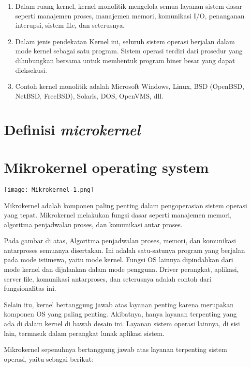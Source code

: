 \begin{enumerate}
	\item Dalam ruang kernel, kernel monolitik mengelola semua layanan sistem dasar seperti manajemen proses, manajemen memori, komunikasi I/O, penanganan interupsi, sistem file, dan seterusnya.
	
	\item Dalam jenis pendekatan Kernel ini, seluruh sistem operasi berjalan dalam mode kernel sebagai satu program. Sistem operasi terdiri dari prosedur yang dihubungkan bersama untuk membentuk program biner besar yang dapat dieksekusi.
	
	\item Contoh kernel monolitik adalah Microsoft Windows, Linux, BSD (OpenBSD, NetBSD, FreeBSD), Solaris, DOS, OpenVMS, dll.
\end{enumerate}

\vskip0.5cm


\section{Definisi \textit{microkernel}}

\section*{Mikrokernel operating system}
\texttt{[image: Mikrokernel-1.png]}


Mikrokernel adalah komponen paling penting dalam pengoperasian sistem operasi yang tepat. Mikrokernel melakukan fungsi dasar seperti manajemen memori, algoritma penjadwalan proses, dan komunikasi antar proses.

Pada gambar di atas, Algoritma penjadwalan proses, memori, dan komunikasi antarproses semuanya disertakan. Ini adalah satu-satunya program yang berjalan pada mode istimewa, yaitu mode kernel. Fungsi OS lainnya dipindahkan dari mode kernel dan dijalankan dalam mode pengguna. Driver perangkat, aplikasi, server file, komunikasi antarproses, dan seterusnya adalah contoh dari fungsionalitas ini.

Selain itu, kernel bertanggung jawab atas layanan penting karena merupakan komponen OS yang paling penting. Akibatnya, hanya layanan terpenting yang ada di dalam kernel di bawah desain ini. Layanan sistem operasi lainnya, di sisi lain, termasuk dalam perangkat lunak aplikasi sistem.

Mikrokernel sepenuhnya bertanggung jawab atas layanan terpenting sistem operasi, yaitu sebagai berikut:

